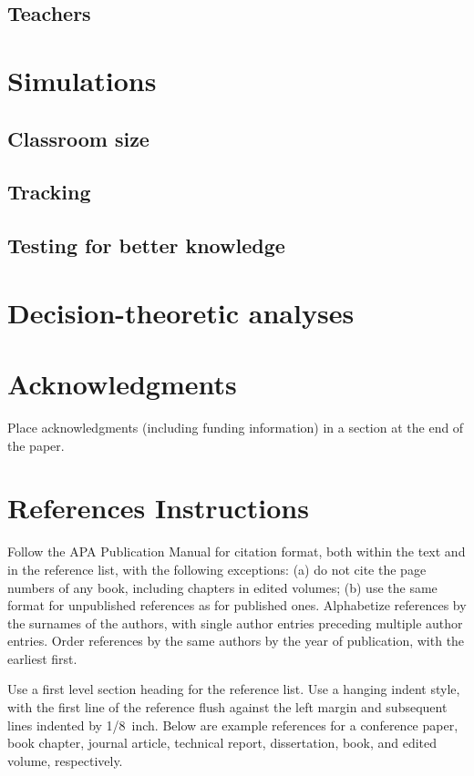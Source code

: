 \documentclass[10pt,letterpaper]{article}
\begin{document}
\subsection{Teachers}

\section{Simulations}

\subsection{Classroom size}

\subsection{Tracking}

\subsection{Testing for better knowledge}

\section{Decision-theoretic analyses}


\section{Acknowledgments}

Place acknowledgments (including funding information) in a section at
the end of the paper.


\section{References Instructions}

Follow the APA Publication Manual for citation format, both within the
text and in the reference list, with the following exceptions: (a) do
not cite the page numbers of any book, including chapters in edited
volumes; (b) use the same format for unpublished references as for
published ones. Alphabetize references by the surnames of the authors,
with single author entries preceding multiple author entries. Order
references by the same authors by the year of publication, with the
earliest first.

Use a first level section heading for the reference list. Use a
hanging indent style, with the first line of the reference flush
against the left margin and subsequent lines indented by 1/8~inch.
Below are example references for a conference paper, book chapter,
journal article, technical report, dissertation, book, and edited
volume, respectively.

\nocite{ChalnickBillman1988a}
\nocite{Feigenbaum1963a}
\nocite{Hill1983a}
\nocite{OhlssonLangley1985a}
\nocite{Lewis1978a}
\nocite{NewellSimon1972a}
\nocite{ShragerLangley1990a}




\setlength{\bibleftmargin}{.125in}
\setlength{\bibindent}{-\bibleftmargin}


\end{document}
